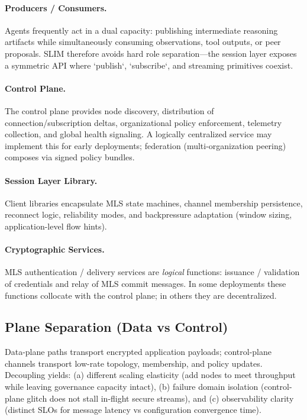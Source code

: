 \documentclass{article}
\theoremstyle{definition}
\theoremstyle{remark}
\begin{document}
\paragraph{Producers / Consumers.} Agents frequently act in a dual capacity:
publishing intermediate reasoning artifacts while simultaneously consuming
observations, tool outputs, or peer proposals. SLIM therefore avoids hard role
separation---the session layer exposes a symmetric API where `publish`,
`subscribe`, and streaming primitives coexist.
\paragraph{Control Plane.} The control plane provides node discovery,
distribution of connection/subscription deltas, organizational policy
enforcement, telemetry collection, and global health signaling. A logically
centralized service may implement this for early deployments; federation
(multi-organization peering) composes via signed policy bundles.
\paragraph{Session Layer Library.} Client libraries encapsulate MLS state
machines, channel membership persistence, reconnect logic, reliability modes,
and backpressure adaptation (window sizing, application-level flow hints).
\paragraph{Cryptographic Services.} MLS authentication / delivery services are
\emph{logical} functions: issuance / validation of credentials and relay of
MLS commit messages. In some deployments these functions collocate with the
control plane; in others they are decentralized.

\subsection{Plane Separation (Data vs Control)}
Data-plane paths transport encrypted application payloads; control-plane
channels transport low-rate topology, membership, and policy updates.
Decoupling yields: (a) different scaling elasticity (add nodes to meet
throughput while leaving governance capacity intact), (b) failure domain
isolation (control-plane glitch does not stall in-flight secure streams), and
(c) observability clarity (distinct SLOs for message latency vs configuration
convergence time).
\end{document}
